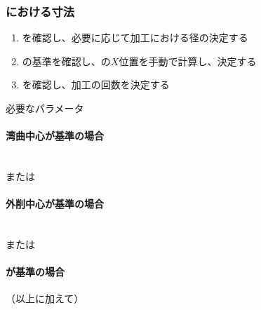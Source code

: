 \subsubsection{\Keyway における寸法}
\begin{enumerate}\item \KeywayType を確認し、必要に応じて加工における径の決定する
\item {}\nameKeywayCenter の基準を確認し、\KeywayCenter の$X$位置を手動で計算し、決定する
\item \KeywayWidth を確認し、加工の回数を決定する
\end{enumerate}
\begin{Parameter}{必要なパラメータ}
\paragraph*{湾曲中心が基準の場合}
\PMKeywayACOD\PMKeywayBDOD\PMKeywayPos\PMKeywayWidth\PMCenterCurvature\\
\PMKeywayCornerR または\PMKeywayCornerC
\tcbline*
\paragraph*{外削中心が基準の場合}
\PMKeywayACOD\PMKeywayBDOD\PMKeywayPos\PMKeywayWidth\\
\PMKeywayCornerR または\PMKeywayCornerC
\tcbline*
\paragraph*{\AsideKeywayDepth が基準の場合}
（以上に加えて）\PMAsideKeywayDepth
\end{Parameter}

\clearpage
